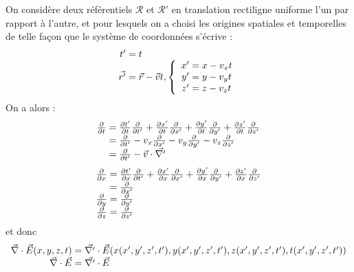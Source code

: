 On considère deux référentiels $\mathcal{R}$ et $\mathcal{R}'$ en translation rectiligne uniforme l'un par rapport à l'autre, et pour lesquels on a choisi les origines spatiales et temporelles de telle façon que le système de coordonnées s'écrive :
$$
	\begin{array}{r@{\;}l}
		t'&=t\\
		\vec{r'}&=\vec{r}-\vec{v}t, \left\{ \begin{array}{r@{\;}l}
				x'&=x-v_{x}t \\
				y'&=y-v_{y}t \\
				z'&=z-v_{z}t \\
			\end{array} \right.
	\end{array}
$$
On a alors :
{\renewcommand*{\arraystretch}{2}
$$
	\begin{array}{r@{\;}l}
		\frac{\partial}{\partial t}&=\frac{\partial t'}{\partial t} \frac{\partial}{\partial t'}
				+\frac{\partial x'}{\partial t} \frac{\partial}{\partial x'}
				+\frac{\partial y'}{\partial t} \frac{\partial}{\partial y'}
				+\frac{\partial z'}{\partial t} \frac{\partial}{\partial z'}\\
		&=\frac{\partial}{\partial t'} - v_{x} \frac{\partial}{\partial x'}
				- v_{y} \frac{\partial}{\partial y'}
				- v_{z} \frac{\partial}{\partial z'}\\
		&=\frac{\partial}{\partial t'} - \vec{v}\cdot \vec{\nabla '}
	\end{array}
$$		
$$
	\begin{array}{r@{\;}l}
		\frac{\partial}{\partial x}&=\frac{\partial t'}{\partial x} \frac{\partial}{\partial t'}
				+\frac{\partial x'}{\partial x} \frac{\partial}{\partial x'}
				+\frac{\partial y'}{\partial x} \frac{\partial}{\partial y'}
				+\frac{\partial z'}{\partial x} \frac{\partial}{\partial z'}\\
		&=\frac{\partial}{\partial x'}\\
		\frac{\partial}{\partial y}&=\frac{\partial}{\partial y'}\\
		\frac{\partial}{\partial z}&=\frac{\partial}{\partial z'}
	\end{array}
$$}
et donc 
$$
	\begin{array}{r@{\;}l}
		\nab\cdot\vec{E}(x,y,z,t)&=\vec{\nabla '}\cdot\vec{E}(x(x',y',z',t'),y(x',y',z',t'),z(x',y',z',t'),t(x',y',z',t'))\\ 
		\nab\cdot\vec{E}&=\vec{\nabla '}\cdot\vec{E}
	\end{array}
$$
